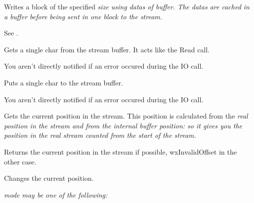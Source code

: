 
Writes a block of the specified \it{size} using datas of \it{buffer}. The datas
are cached in a buffer before being sent in one block to the stream.


See .



Gets a single char from the stream buffer. It acts like the Read call.


You aren't directly notified if an error occured during the IO call.





Puts a single char to the stream buffer.


You aren't directly notified if an error occured during the IO call.





Gets the current position in the stream. This position is calculated from
the \it{real} position in the stream and from the internal buffer position: so
it gives you the position in the \it{real} stream counted from the start of
the stream.


Returns the current position in the stream if possible, wxInvalidOffset in the
other case.

\label{wxstreambufferseek}


Changes the current position.

\it{mode} may be one of the following:

